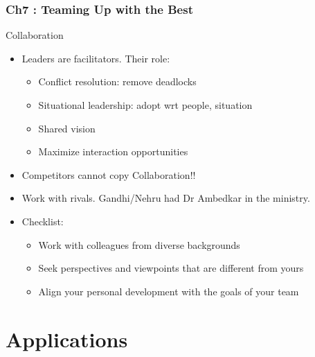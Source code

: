 \begin{frame}[fragile]\frametitle{Ch7 : Teaming Up with the Best}

Collaboration

\begin{itemize}
\item Leaders are facilitators. Their role:
	\begin{itemize}
	\item Conflict resolution: remove deadlocks
	\item Situational leadership: adopt wrt people, situation
	\item Shared vision
	\item Maximize interaction opportunities
	\end{itemize}
\item Competitors cannot copy Collaboration!!
\item Work with rivals. Gandhi/Nehru had Dr Ambedkar in the ministry.
\item Checklist:
	\begin{itemize}
	\item  Work with colleagues from diverse backgrounds
	\item  Seek perspectives and viewpoints that are different from yours
	\item Align your personal development with the goals of your team
	\end{itemize}
\end{itemize}

\end{frame}

\section{Applications}

